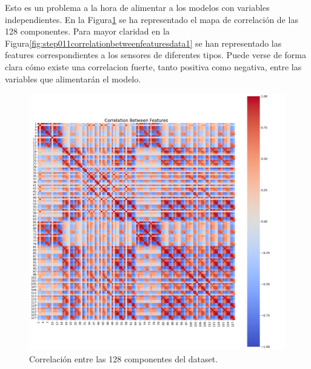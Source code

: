 Esto es un problema a la hora de alimentar a los modelos con variables independientes. En la Figura\ref{fig:step011correlationbetweenfeatures} se ha representado el mapa de correlación de las 128 componentes. Para mayor claridad en la Figura\ref{fig:step011correlationbetweenfeaturesdata1} se han representado las features correspondientes a los sensores de diferentes tipos. Puede verse de forma clara cómo existe una correlacion fuerte, tanto positiva como negativa, entre las variables que alimentarán el modelo.

\begin{figure}
	\centering
	\includegraphics[width=1\linewidth]{../py_imgs/Step0_1_1_CorrelationBetweenFeatures}
	\caption[Correlation map dataset]{Correlación entre las 128 componentes del dataset.}
	\label{fig:step011correlationbetweenfeatures}
\end{figure}

